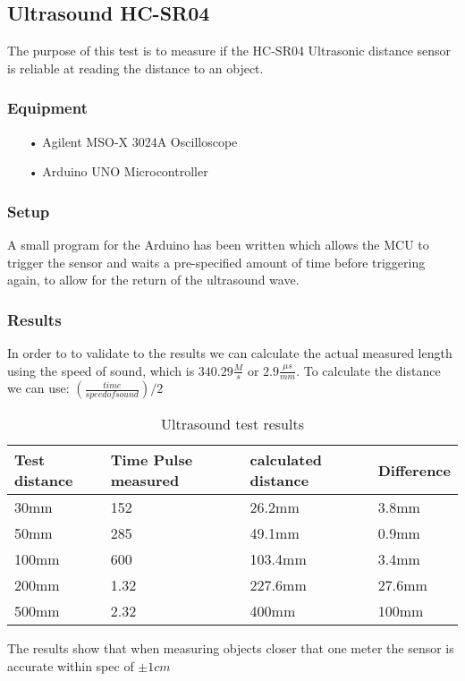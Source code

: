 \subsection{Ultrasound HC-SR04}
The purpose of this test is to measure if the HC-SR04 Ultrasonic distance sensor is reliable at reading the distance to an object.

\subsubsection{Equipment}

\begin{enumerate}
    \item[•]Agilent MSO-X 3024A Oscilloscope 
    \item[•]Arduino UNO Microcontroller  
\end{enumerate}

\subsubsection{Setup}
A small program for the Arduino has been written which allows the MCU to trigger the sensor and waits a pre-specified amount of time before triggering again, to allow for the return of the ultrasound wave. 

\subsubsection{Results}
In order to to validate to the results we can calculate the actual measured length using the speed of sound, which is $ 340.29 \frac{M}{s} $ or $2.9\frac{\mu s}{mm}$. To calculate the distance we can use: $(\frac{time}{speed of sound})/2$ \cite{SOF}
\begin{table}[h]
\centering
\label{ultrasoundtestresults}
\begin{tabular}{|l|l|l|l|}
\hline
\textbf{Test distance} & \textbf{Time Pulse measured} & \textbf{calculated  distance} & \textbf{Difference} \\ \hline
30mm          & 152                 & 26.2mm               & 3.8mm      \\ \hline
50mm          & 285                 & 49.1mm               & 0.9mm      \\ \hline
100mm         & 600                 & 103.4mm              & 3.4mm      \\ \hline
200mm         & 1.32                & 227.6mm              & 27.6mm     \\ \hline
500mm         & 2.32                & 400mm                & 100mm      \\ \hline
\end{tabular}
\caption{Ultrasound test results}
\end{table}

The results show that when measuring objects closer that one meter the sensor is accurate within spec of $\pm 1cm$